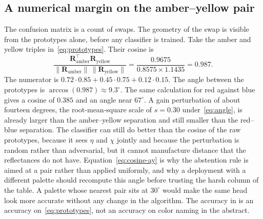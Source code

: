 \subsection{A numerical margin on the amber--yellow pair}
\label{sec:amber-number}

The confusion matrix is a count of swaps. The geometry of the swap is visible from the prototypes alone, before any classifier is trained. Take the amber and yellow triples in~\eqref{eq:prototypes}. Their cosine is
\begin{equation}
\frac{\mathbf{R}_{\mathrm{amber}}^{\top}\mathbf{R}_{\mathrm{yellow}}}
{\lVert\mathbf{R}_{\mathrm{amber}}\rVert\,\lVert\mathbf{R}_{\mathrm{yellow}}\rVert}
= \frac{0.9675}{0.8575\times 1.1435}
= 0.987.
\label{eq:cosine-ay}
\end{equation}
The numerator is $0.72\cdot 0.85+0.45\cdot 0.75+0.12\cdot 0.15$. The angle between the prototypes is $\arccos(0.987)\approx 9.3^{\circ}$. The same calculation for red against blue gives a cosine of $0.385$ and an angle near $67^{\circ}$. A gain perturbation of about fourteen degrees, the root-mean-square scale of $s=0.30$ under~\eqref{eq:angle}, is already larger than the amber--yellow separation and still smaller than the red--blue separation. The classifier can still do better than the cosine of the raw prototypes, because it sees $\eta$ and $\chi$ jointly and because the perturbation is random rather than adversarial, but it cannot manufacture distance that the reflectances do not have. Equation~\eqref{eq:cosine-ay} is why the abstention rule is aimed at a pair rather than applied uniformly, and why a deployment with a different palette should recompute this angle before trusting the harsh column of the table. A palette whose nearest pair sits at $30^{\circ}$ would make the same head look more accurate without any change in the algorithm. The accuracy in  is an accuracy on~\eqref{eq:prototypes}, not an accuracy on color naming in the abstract.
